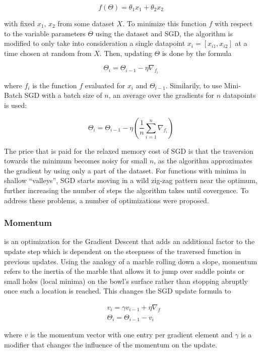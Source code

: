 \[ f(\Theta) =  \theta_1 x_1 + \theta_2 x_2\]

\noindent with fixed $x_1$, $x_2$ from some dataset $X$. To minimize this function $f$ with respect to the variable parameters $\Theta$ using the dataset and SGD, the algorithm is modified to only take into consideration a single datapoint $x_i = [x_{i1}, x_{i2}]$ at a time chosen at random from $X$. Then, updating $\Theta$ is done by the formula

\[ \Theta_i = \Theta_{i-1} - \eta \nabla_{f_i} \]

\noindent where $f_i$ is the function $f$ evaluated for $x_i$ and $\Theta_{i-1}$. Similarily, to use Mini-Batch SGD with a batch size of $n$, an average over the gradients for $n$ datapoints is used:

\[ \Theta_i = \Theta_{i-1} - \eta \left ( \frac{1}{n} \sum \limits_{i=1}^{n} \nabla_{f_i} \right ) \]

\noindent The price that is paid for the relaxed memory cost of SGD is that the traversion towards the minimum becomes noisy for small $n$, as the algorithm approximates the gradient by using only a part of the dataset. For functions with minima in shallow ``valleys'', SGD starts moving in a wild zig-zag pattern near the optimum, further increasing the number of steps the algorithm takes until covergence. To address these problems, a number of optimizations were proposed.


	\subsubsection {Momentum}
 is an optimization for the Gradient Descent that adds an additional factor to the update step which is dependent on the steepness of the traversed function in previous updates. Using the analogy of a marble rolling down a slope, momentum refers to the inertia of the marble that allows it to jump over saddle points or small holes (local minima) on the bowl's surface rather than stopping abruptly once such a location is reached. This changes the SGD update formula to

\begin {align}
	& v_i = \gamma v_ {i-1} + \eta \nabla_f\\ 
	& \Theta_i = \Theta_{i-1} - v_i
\end {align}

\noindent where $v$ is the momentum vector with one entry per gradient element and $\gamma$ is a modifier that changes the influence of the momentum on the update.

